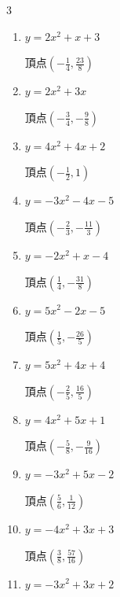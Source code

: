 \begin{multicols}{3}
\begin{enumerate}
  \itemsep=90pt
  \item $\displaystyle y=2x^{2}+x+3$

        $\displaystyle 頂点\left( -\frac{1}{4} , \frac{23}{8} \right)$

  \item $\displaystyle y=2x^{2}+3x$

        $\displaystyle 頂点\left( -\frac{3}{4} , -\frac{9}{8} \right)$

  \item $\displaystyle y=4x^{2}+4x+2$

        $\displaystyle 頂点\left( -\frac{1}{2} , 1 \right)$

  \item $\displaystyle y=-3x^{2}-4x-5$

        $\displaystyle 頂点\left( -\frac{2}{3} , -\frac{11}{3} \right)$

  \item $\displaystyle y=-2x^{2}+x-4$

        $\displaystyle 頂点\left( \frac{1}{4} , -\frac{31}{8} \right)$

\columnbreak %

  \item $\displaystyle y=5x^{2}-2x-5$

        $\displaystyle 頂点\left( \frac{1}{5} , -\frac{26}{5} \right)$

  \item $\displaystyle y=5x^{2}+4x+4$

        $\displaystyle 頂点\left( -\frac{2}{5} , \frac{16}{5} \right)$

  \item $\displaystyle y=4x^{2}+5x+1$

        $\displaystyle 頂点\left( -\frac{5}{8} , -\frac{9}{16} \right)$

  \item $\displaystyle y=-3x^{2}+5x-2$

        $\displaystyle 頂点\left( \frac{5}{6} , \frac{1}{12} \right)$

  \item $\displaystyle y=-4x^{2}+3x+3$

        $\displaystyle 頂点\left( \frac{3}{8} , \frac{57}{16} \right)$

\columnbreak %

  \item $\displaystyle y=-3x^{2}+3x+2$


\end{enumerate}
\end{multicols}
